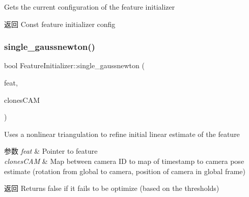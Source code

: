 Gets the current configuration of the feature initializer 

\begin{DoxyReturn}{返回}
Const feature initializer config 
\end{DoxyReturn}
\mbox{\label{classov__core_1_1FeatureInitializer_a27eb3af3c4e22473e795966eff800599}} 
\subsubsection{\texorpdfstring{single\+\_\+gaussnewton()}{single\_gaussnewton()}}
{\footnotesize\ttfamily bool Feature\+Initializer\+::single\+\_\+gaussnewton (\begin{DoxyParamCaption}\item[{std\+::shared\+\_\+ptr$<$ \hyperlink{classov__core_1_1Feature}{Feature} $>$}]{feat,  }\item[{std\+::unordered\+\_\+map$<$ size\+\_\+t, std\+::unordered\+\_\+map$<$ double, \hyperlink{structov__core_1_1FeatureInitializer_1_1ClonePose}{Clone\+Pose} $>$$>$ \&}]{clones\+C\+AM }\end{DoxyParamCaption})}



Uses a nonlinear triangulation to refine initial linear estimate of the feature 


\begin{DoxyParams}{参数}
{\em feat} & Pointer to feature \\
\hline
{\em clones\+C\+AM} & Map between camera ID to map of timestamp to camera pose estimate (rotation from global to camera, position of camera in global frame) \\
\hline
\end{DoxyParams}
\begin{DoxyReturn}{返回}
Returns false if it fails to be optimize (based on the thresholds) 
\end{DoxyReturn}
\mbox{\label{classov__core_1_1FeatureInitializer_a86e8f87f677689e6588516f8d08086d7}} 
